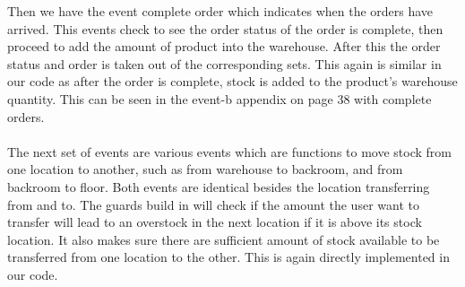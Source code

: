 \documentclass[a4paper]{article}
\begin{document}
Then we have the event complete order which indicates when the orders have arrived. This events check to see the order status of the order is complete, then proceed to add the amount of product into the warehouse. After this the order status and order is taken out of the corresponding sets. This again is similar in our code as after the order is complete, stock is added to the product’s warehouse quantity. This can be seen in the event-b appendix on page 38 with complete orders. 
\\\\
The next set of events are various events which are functions to move stock from one location to another, such as from warehouse to backroom, and from backroom to floor. Both events are identical besides the location transferring from and to. The guards build in will check if the amount the user want to transfer will lead to an overstock in the next location if it is above its stock location. It also makes sure there are sufficient amount of stock available to be transferred from one location to the other. This is again directly implemented in our code. 
\\\\
\end{document}
